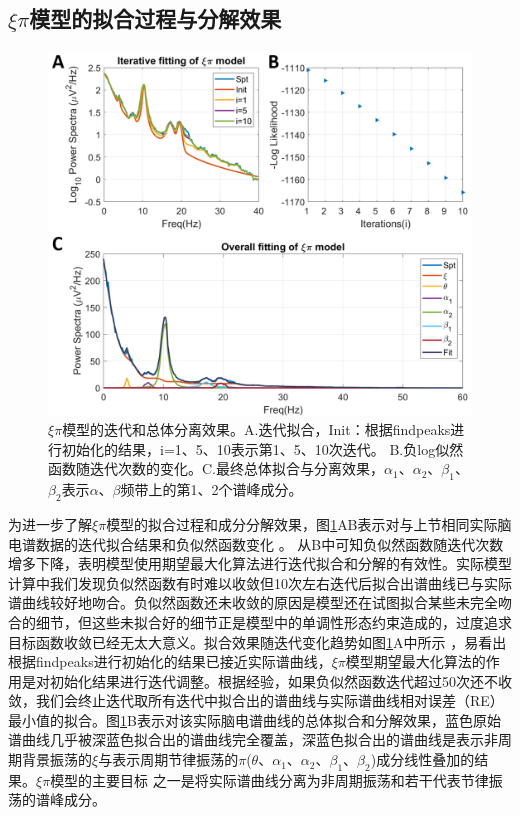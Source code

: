 \subsection{\texorpdfstring{$\xi\pi$}{ξπ}模型的拟合过程与分解效果}
\begin{figure}[!h]
	\includegraphics[width=15cm]{pic/xipi/allinone.png}
	\caption{$\xi\pi$模型的迭代和总体分离效果。A.迭代拟合，Init：根据findpeaks进行初始化的结果，i=1、5、10表示第1、5、10次迭代。 
	B.负log似然函数随迭代次数的变化。C.最终总体拟合与分离效果，$\alpha_1$、$\alpha_2$、$\beta_1$、$\beta_2$表示$\alpha$、$\beta$频带上的第1、2个谱峰成分。}
	\label{7:allinone}
\end{figure}

为进一步了解$\xi\pi$模型的拟合过程和成分分解效果，图\ref{7:allinone}AB表示对与上节相同实际脑电谱数据的迭代拟合结果和负似然函数变化
。 从B中可知负似然函数随迭代次数增多下降，表明模型使用期望最大化算法进行迭代拟合和分解的有效性。实际模型计算中我们发现负似然函数有时难以收敛但10次左右迭代后拟合出谱曲线已与实际谱曲线较好地吻合。负似然函数还未收敛的原因是模型还在试图拟合某些未完全吻合的细节，但这些未拟合好的细节正是模型中的单调性形态约束造成的，过度追求目标函数收敛已经无太大意义。拟合效果随迭代变化趋势如图\ref{7:allinone}A中所示
，易看出根据findpeaks进行初始化的结果已接近实际谱曲线，$\xi\pi$模型期望最大化算法的作用是对初始化结果进行迭代调整。根据经验，如果负似然函数迭代超过50次还不收敛，我们会终止迭代取所有迭代中拟合出的谱曲线与实际谱曲线相对误差（RE）最小值的拟合。图\ref{7:allinone}B表示对该实际脑电谱曲线的总体拟合和分解效果，蓝色原始谱曲线几乎被深蓝色拟合出的谱曲线完全覆盖，深蓝色拟合出的谱曲线是表示非周期背景振荡的$\xi$与表示周期节律振荡的$\pi$($\theta$、$\alpha_1$、$\alpha_2$、$\beta_1$、$\beta_2$)成分线性叠加的结果。$\xi\pi$模型的主要目标
之一是将实际谱曲线分离为非周期振荡和若干代表节律振荡的谱峰成分。



